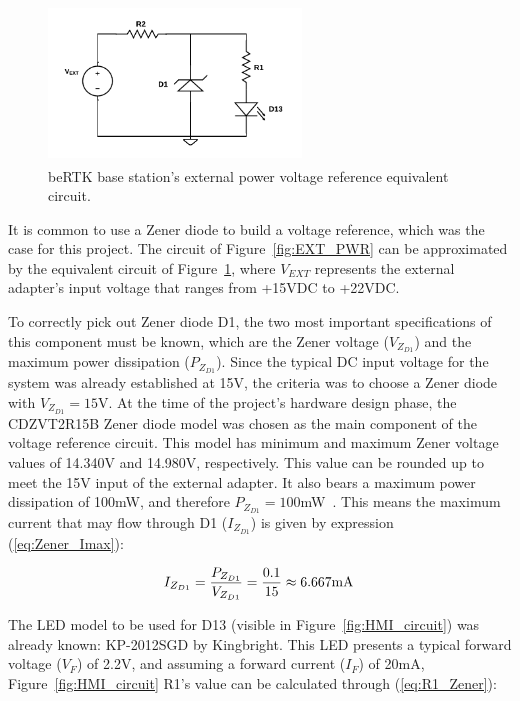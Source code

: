 \begin{figure}[h]
	\centering
	\includegraphics[width=0.6\textwidth]{Chapters/Figures/chapter3/EXT_PWR_2.pdf}
	\caption{beRTK\textsuperscript{\textregistered} base station's external power voltage reference equivalent circuit.}
	\label{fig:EXT_PWR_2}
\end{figure}

It is common to use a Zener diode to build a voltage reference, which was the case for this project. The circuit of Figure~\ref{fig:EXT_PWR} can be approximated by the equivalent circuit of Figure~\ref{fig:EXT_PWR_2}, where $V_{EXT}$ represents the external adapter's input voltage that ranges from +15VDC to +22VDC.

To correctly pick out Zener diode D1, the two most important specifications of this component must be known, which are the Zener voltage ($V_{Z_{D1}}$) and the maximum power dissipation ($P_{Z_{D1}}$). Since the typical DC input voltage for the system was already established at 15V, the criteria was to choose a Zener diode with $V_{Z_{D1}}=15$V. At the time of the project's hardware design phase, the CDZVT2R15B Zener diode model was chosen as the main component of the voltage reference circuit. This model has minimum and maximum Zener voltage values of 14.340V and 14.980V, respectively.
This value can be rounded up to meet the 15V input of the external adapter.
It also bears a maximum power dissipation of 100mW, and therefore $P_{Z_{D1}}=100$mW~\cite{CDZVT2R15B}. This means the maximum current that may flow through D1 ($I_{Z_{D1}}$) is given by expression (\ref{eq:Zener_Imax}):

\begin{equation}\label{eq:Zener_Imax}
	I_{Z_{D1}}=\frac{P_{Z_{D1}}}{V_{Z_{D1}}}=\frac{0.1}{15} \approx 6.667 \textrm{mA}\,\medskip
\end{equation}

The LED model to be used for D13 (visible in Figure~\ref{fig:HMI_circuit}) was already known: KP-2012SGD by Kingbright. This LED presents a typical forward voltage ($V_F$) of 2.2V, and assuming a forward current ($I_F$) of 20mA, Figure~\ref{fig:HMI_circuit} R1's value can be calculated through (\ref{eq:R1_Zener}):

